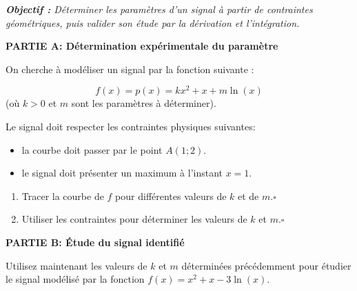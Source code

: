 \documentclass[a4paper,10pt]{report}
\begin{document}
\renewcommand{\labelitemi}{\textbullet}

\pagestyle{DS_FP}
\NomPrenomNote{}


\bigskip

\emph{\textbf{Objectif :} Déterminer les paramètres d'un signal à partir de contraintes géométriques, puis valider son étude par la dérivation et l'intégration.}
\medskip

\textbf{PARTIE A: Détermination expérimentale du paramètre}


\medskip

On cherche à modéliser un signal par la fonction suivante :  

\[f(x) =  p(x) = kx^2 + x + m\ln(x)\] (où $k>0$ et $m$ sont les paramètres à déterminer).
\medskip

Le signal doit respecter les contraintes physiques suivantes:

\begin{itemize}
    \item la courbe doit passer par le point $A(1;2)$.
    \item le signal doit présenter un maximum à l'instant $x=1$.
\end{itemize}

\begin{enumerate}
    \item Tracer la courbe de $f$ pour différentes valeurs de $k$ et de $m$.\hfill $\square$
    \item Utiliser les contraintes pour déterminer les valeurs de $k$ et $m$.\hfill $\square$
\end{enumerate}

\bigskip

\textbf{PARTIE B: Étude du signal identifié}

\medskip
Utilisez maintenant les valeurs de $k$ et $m$ déterminées précédemment pour étudier le signal modélisé par la fonction $f(x) = x^2 + x - 3\ln(x)$.
\end{document}
